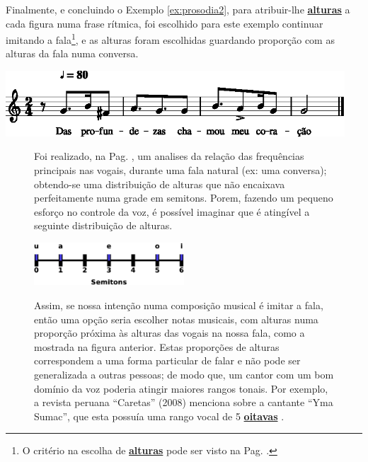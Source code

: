 \begin{example}
\label{ex:prosodia3}
Finalmente, e concluindo o Exemplo \ref{ex:prosodia2}, 
para atribuir-lhe \hyperref[sec:pos:Altura]{\textbf{alturas}} a cada figura numa frase rítmica,
foi escolhido para este exemplo continuar imitando a fala\footnote{O 
critério na escolha de \hyperref[sec:pos:Altura]{\textbf{alturas}} pode ser visto na Pag. \pageref{ref:minhasvogais}. },
e as alturas foram escolhidas guardando proporção com as alturas da fala numa conversa.
\begin{center}
\includegraphics[width=0.95\textwidth]{chapters/cap-musica-topicos/frase5-1.eps}
\end{center}
\end{example}

\begin{figure}[!ht]
\begin{elaboracion}[title=Minhas vogais]
Foi realizado, na Pag. \pageref{fig:timbresvocais}, um analises da relação das frequências principais nas vogais,
durante uma fala natural (ex: uma conversa);
obtendo-se uma distribuição de alturas que não encaixava perfeitamente numa grade em semitons.
Porem, fazendo um pequeno esforço no controle da voz, 
é possível imaginar que é atingível a seguinte distribuição de alturas.
\begin{center}
\includegraphics[width=0.50\textwidth]{chapters/cap-musica-topicos/vocales-semitons2.eps}
\end{center}
Assim, se nossa intenção numa composição musical é imitar a fala, 
então uma opção seria escolher notas musicais, 
com alturas numa proporção próxima às alturas das vogais na nossa fala, 
como a mostrada na figura anterior.
Estas proporções de alturas correspondem a uma forma particular de falar e não pode ser generalizada a outras pessoas;
de modo que, um cantor com um bom domínio da voz poderia atingir maiores rangos tonais.
Por exemplo, a revista peruana ``Caretas'' (2008)  menciona sobre a cantante ``Yma Sumac'',
que esta possuía uma rango vocal de 5 \hyperref[sec:pos:Oitava]{\textbf{oitavas}} \cite[pp. 73]{2008caretas}.  
\end{elaboracion}
\label{ref:minhasvogais}
\end{figure}






